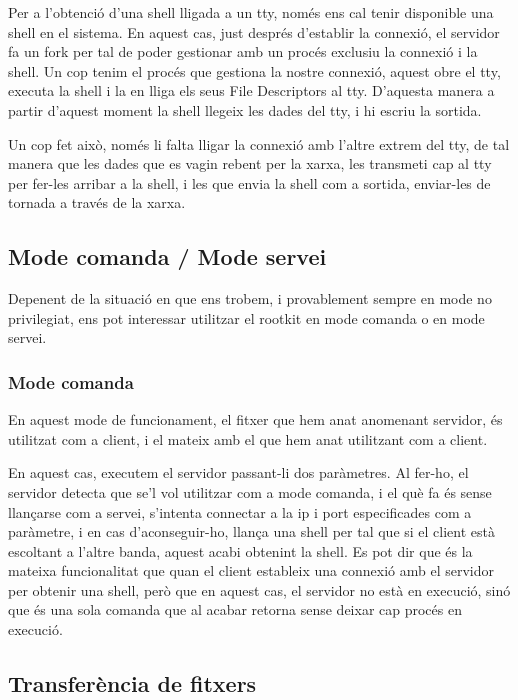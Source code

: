 Per a l'obtenció d'una shell lligada a un tty, només ens cal tenir disponible una shell en el sistema. En aquest cas, just després
d'establir la connexió, el servidor fa un fork per tal de poder gestionar amb un procés exclusiu la connexió i la shell. Un cop tenim
el procés que gestiona la nostre connexió, aquest obre el tty, executa la shell i la en lliga els seus File Descriptors al tty. D'aquesta manera
a partir d'aquest moment la shell llegeix les dades del tty, i hi escriu la sortida.

Un cop fet això, només li falta lligar la connexió amb l'altre extrem del tty, de tal manera que les dades que es vagin rebent per la xarxa,
les transmeti cap al tty per fer-les arribar a la shell, i les que envia la shell com a sortida, enviar-les de tornada a través de la xarxa.

\subsection{Mode comanda / Mode servei}

Depenent de la situació en que ens trobem, i provablement sempre en mode no privilegiat, ens pot interessar utilitzar el rootkit en mode comanda o
en mode servei. 

\subsubsection{Mode comanda}
En aquest mode de funcionament, el fitxer que hem anat anomenant servidor, és utilitzat com a client, i el mateix amb el que hem anat utilitzant com
a client. 

En aquest cas, executem el servidor passant-li dos paràmetres. Al fer-ho, el servidor detecta que se'l vol utilitzar com a mode comanda, i el què fa
és sense llançarse com a servei, s'intenta connectar a la ip i port especificades com a paràmetre, i en cas d'aconseguir-ho, llança una shell per tal
que si el client està escoltant a l'altre banda, aquest acabi obtenint la shell. Es pot dir que és la mateixa funcionalitat que quan el client estableix
una connexió amb el servidor per obtenir una shell, però que en aquest cas, el servidor no està en execució, sinó que és una sola comanda que al acabar
retorna sense deixar cap procés en execució.

\subsection{Transferència de fitxers}

